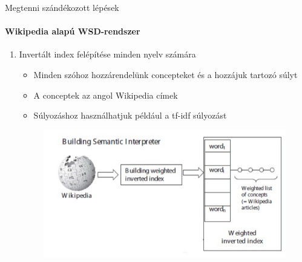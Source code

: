 \begin{frame}{Megtenni szándékozott lépések}
\framesubtitle{Wikipedia alapú WSD-rendszer}

		\begin{enumerate}
			\item Invertált index felépítése minden nyelv számára	
			\begin{itemize}
				\item Minden szóhoz hozzárendelünk concepteket és a hozzájuk tartozó súlyt
				\item A conceptek az angol Wikipedia címek
				\item Súlyozáshoz használhatjuk például a tf-idf súlyozást
			\end{itemize}			
			
		\begin{figure}[t]
			\includegraphics[scale=0.4]{images/invindex}
 		\end{figure}			
			
			\savecounter	
		\end{enumerate}

\end{frame}

